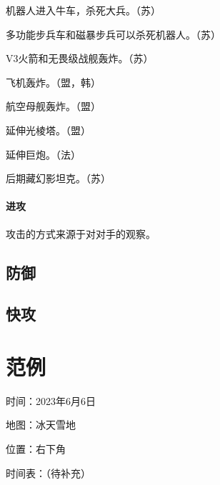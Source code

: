 \documentclass[12pt]{ctexart}
\begin{document}
			机器人进入牛车，杀死大兵。（苏）
			
			多功能步兵车和磁暴步兵可以杀死机器人。（苏）
			
			V3火箭和无畏级战舰轰炸。（苏）
			
			飞机轰炸。（盟，韩）
			
			航空母舰轰炸。（盟）
			
			延伸光棱塔。（盟）
			
			延伸巨炮。（法）
			
			后期藏幻影坦克。（苏）
			\paragraph{进攻}
			攻击的方式来源于对对手的观察。
		\subsection{防御}
		\subsection{快攻}
	\newpage
	
	\section{范例}
		时间：2023年6月6日
	
		地图：冰天雪地
		
		位置：右下角
		
		时间表：（待补充）
\end{document}
